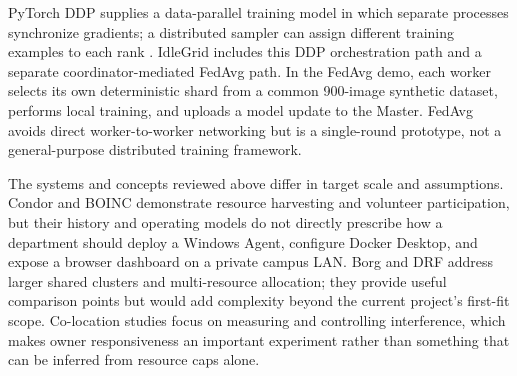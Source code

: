 \documentclass{article}
\begin{document}
PyTorch DDP supplies a data-parallel training model in which separate processes synchronize gradients; a distributed sampler can assign different training examples to each rank \cite{pytorchddp}. IdleGrid includes this DDP orchestration path and a separate coordinator-mediated FedAvg path. In the FedAvg demo, each worker selects its own deterministic shard from a common 900-image synthetic dataset, performs local training, and uploads a model update to the Master. FedAvg avoids direct worker-to-worker networking but is a single-round prototype, not a general-purpose distributed training framework.

The systems and concepts reviewed above differ in target scale and assumptions. Condor and BOINC demonstrate resource harvesting and volunteer participation, but their history and operating models do not directly prescribe how a department should deploy a Windows Agent, configure Docker Desktop, and expose a browser dashboard on a private campus LAN. Borg and DRF address larger shared clusters and multi-resource allocation; they provide useful comparison points but would add complexity beyond the current project's first-fit scope. Co-location studies focus on measuring and controlling interference, which makes owner responsiveness an important experiment rather than something that can be inferred from resource caps alone.
\end{document}

